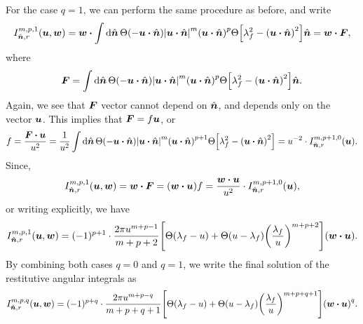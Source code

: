 \documentclass[aps,prl,preprint,groupedaddress,10pt]{revtex4-2}
\begin{document}
For the case $q=1$, we can perform the same procedure as before, and write
\begin{equation}
    I_{\bn,r}^{m,p,1}\pqty{\bu,\bw}=\bw\vdot\int\dd{\bn}\Theta\pqty{-\bu\vdot\bn}
    \abs{\bu\vdot\bn}^m\pqty{\bu\vdot\bn}^p
    \Theta\bqty{\lambda_f^2-\pqty{\bu\vdot\bn}^2}\bn=\bw\vdot\bF,
\end{equation}
where
\begin{equation}
    \bF = \int\dd{\bn}\Theta\pqty{-\bu\vdot\bn}
    \abs{\bu\vdot\bn}^m\pqty{\bu\vdot\bn}^p
    \Theta\bqty{\lambda_f^2-\pqty{\bu\vdot\bn}^2}\bn.
\end{equation}
Again, we see that $\vb*{F}$ vector cannot depend on $\hat{\vb*{n}}$, and depends only on the vector
$\vb*{u}$. This implies that $\vb*{F}=f\vb*{u}$, or
\begin{equation}
    f=\frac{\bF\vdot\bu}{u^2}=\frac{1}{u^2}\int\dd{\bn}\Theta\pqty{-\bu\vdot\bn}
    \abs{\bu\vdot\bn}^m\pqty{\bu\vdot\bn}^{p+1}
    \Theta\bqty{\lambda_f^2-\pqty{\bu\vdot\bn}^2}=
    u^{-2}\cdot I_{\bn,r}^{m,p+1,0}(\bu).
\end{equation}
Since,
\begin{equation}
    I_{\bn,r}^{m,p,1}(\bu,\bw)=\bw\vdot\bF=\pqty{\bw\vdot\bu}f=
    \frac{\bw\vdot\bu}{u^2}\cdot I_{\bn,r}^{m,p+1,0}(\bu),
\end{equation}
or writing explicitly, we have
\begin{equation}
    I_{\bn,r}^{m,p,1}(\bu,\bw)=(-1)^{p+1}\cdot\frac{2\pi u^{m+p-1}}{m+p+2}
    \bqty{\Theta\pqty{\lambda_f-u}+\Theta\pqty{u-\lambda_f}
        \pqty{\frac{\lambda_f}{u}}^{m+p+2}}\pqty{\bw\vdot\bu}.
\end{equation}
By combining both cases $q=0$ and $q=1$, we write the final solution of the
restitutive angular integrals as
\begin{equation}
    I_{\bn,r}^{m,p,q}(\bu,\bw)=(-1)^{p+q}\cdot\frac{2\pi u^{m+p-q}}{m+p+q+1}
    \bqty{\Theta\pqty{\lambda_f-u}+\Theta\pqty{u-\lambda_f}
        \pqty{\frac{\lambda_f}{u}}^{m+p+q+1}}\pqty{\bw\vdot\bu}^q.
\end{equation}
\end{document}
